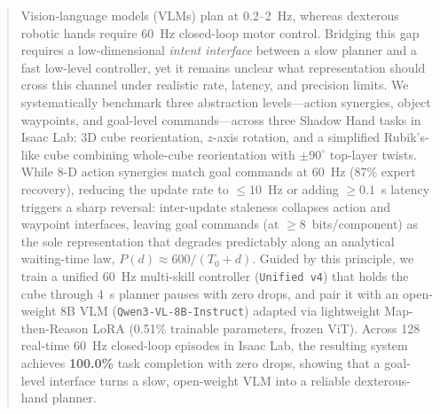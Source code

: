 \begin{abstract}
Vision-language models (VLMs) plan at 0.2--2~Hz, whereas dexterous robotic hands require 60~Hz closed-loop motor control.
Bridging this gap requires a low-dimensional \emph{intent interface} between a slow planner and a fast low-level controller, yet it remains unclear what representation should cross this channel under realistic rate, latency, and precision limits.
We systematically benchmark three abstraction levels---action synergies, object waypoints, and goal-level commands---across three Shadow Hand tasks in Isaac Lab: 3D cube reorientation, $z$-axis rotation, and a simplified Rubik's-like cube combining whole-cube reorientation with $\pm 90^\circ$ top-layer twists.
While 8-D action synergies match goal commands at 60~Hz (87\% expert recovery), reducing the update rate to $\le 10$~Hz or adding $\ge 0.1$~s latency triggers a sharp reversal: inter-update staleness collapses action and waypoint interfaces, leaving goal commands (at $\ge 8$~bits/component) as the sole representation that degrades predictably along an analytical waiting-time law, $P(d) \approx 600/(T_0 + d)$.
Guided by this principle, we train a unified 60~Hz multi-skill controller (\texttt{Unified v4}) that holds the cube through 4~s planner pauses with zero drops, and pair it with an open-weight 8B VLM (\texttt{Qwen3-VL-8B-Instruct}) adapted via lightweight Map-then-Reason LoRA (0.51\% trainable parameters, frozen ViT).
Across 128 real-time 60~Hz closed-loop episodes in Isaac Lab, the resulting system achieves \textbf{100.0\%} task completion with zero drops, showing that a goal-level interface turns a slow, open-weight VLM into a reliable dexterous-hand planner.
\end{abstract}
